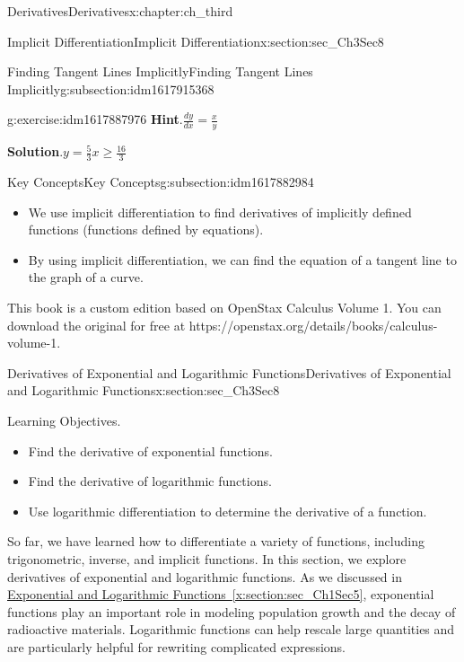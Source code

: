 \documentclass[oneside,10pt,]{book}
\newcommand{\blocktitlefont}{\relax}
\newcommand{\xreffont}{\relax}
\numberwithin{equation}{section}
\begin{document}
\begin{chapterptx}{Derivatives}{}{Derivatives}{}{}{x:chapter:ch_third}
\begin{sectionptx}{Implicit Differentiation}{}{Implicit Differentiation}{}{}{x:section:sec_Ch3Sec8}
\begin{subsectionptx}{Finding Tangent Lines Implicitly}{}{Finding Tangent Lines Implicitly}{}{}{g:subsection:idm1617915368}
\begin{inlineexercise}{}{g:exercise:idm1617887976}
\noindent\textbf{\blocktitlefont Hint}.\hypertarget{g:hint:idm1617885544}{}\quad{}\(\frac{dy}{dx}=\frac{x}{y}\)%
\par\smallskip%
\noindent\textbf{\blocktitlefont Solution}.\hypertarget{g:solution:idm1617884520}{}\quad{}\(y=\frac{5}{3}x\geq \frac{16}{3}\)%
\end{inlineexercise}%
\end{subsectionptx}
%
%
\typeout{************************************************}
\typeout{************************************************}
%
\begin{subsectionptx}{Key Concepts}{}{Key Concepts}{}{}{g:subsection:idm1617882984}
%
\begin{itemize}[label=\textbullet]
\item{}We use implicit differentiation to find derivatives of implicitly defined functions (functions defined by equations).%
\item{}By using implicit differentiation, we can find the equation of a tangent line to the graph of a curve.%
\end{itemize}
\end{subsectionptx}
This book is a custom edition based on OpenStax Calculus Volume 1. You can download the original for free at https:\slash{}\slash{}openstax.org\slash{}details\slash{}books\slash{}calculus-volume-1.%
\end{sectionptx}
%
%
\typeout{************************************************}
\typeout{************************************************}
%
\begin{sectionptx}{Derivatives of Exponential and Logarithmic Functions}{}{Derivatives of Exponential and Logarithmic Functions}{}{}{x:section:sec_Ch3Sec8}
\begin{introduction}{Learning Objectives.}%
%
\begin{itemize}[label=\textbullet]
\item{}Find the derivative of exponential functions.%
\item{}Find the derivative of logarithmic functions.%
\item{}Use logarithmic differentiation to determine the derivative of a function.%
\end{itemize}
So far, we have learned how to differentiate a variety of functions, including trigonometric, inverse, and implicit functions. In this section, we explore derivatives of exponential and logarithmic functions. As we discussed in \hyperref[x:section:sec_Ch1Sec5]{Exponential and Logarithmic Functions~{\xreffont\ref{x:section:sec_Ch1Sec5}}}, exponential functions play an important role in modeling population growth and the decay of radioactive materials. Logarithmic functions can help rescale large quantities and are particularly helpful for rewriting complicated expressions.%

\end{introduction}
\end{sectionptx}
\end{chapterptx}
\end{document}
